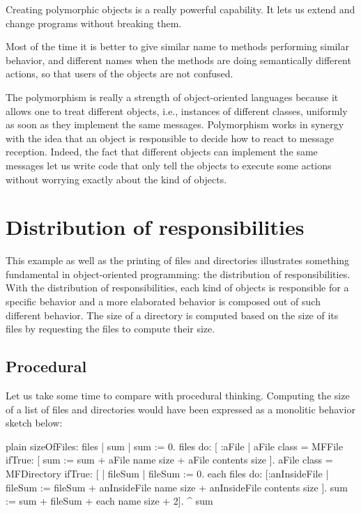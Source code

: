 \documentclass[10pt,twoside,english]{_support/latex/sbabook/sbabook}
\begin{document}
\begin{important}
Creating polymorphic objects is a really powerful capability. It lets us extend and change programs without breaking them. 
\end{important}

Most of the time it is better to give similar name to methods performing similar behavior, and different names when the methods are doing semantically different actions, so that users of the objects are not confused. 

The  polymorphism is really a strength of object-oriented languages because it allows one to treat different objects, i.e., instances of different classes, uniformly as soon as they implement the same messages. Polymorphism works in synergy with the idea that an object is responsible to decide how to react to message reception. Indeed, the fact that different objects can implement the same messages let us write code that only tell the objects to execute some actions without worrying exactly about the kind of objects. 
\section{Distribution of responsibilities}
This example as well as the printing of files and directories illustrates something fundamental in 
object-oriented programming: the distribution of responsibilities. With the distribution of responsibilities,  each kind of objects is responsible for a specific behavior and a more elaborated behavior is composed out of such different behavior. The size of a directory is computed based on the size of its files by requesting the files to compute their size. 
\subsection{Procedural}
Let us take some time to compare with procedural thinking. Computing the size of a list of files and directories would have been expressed as a monolitic behavior sketch below:

\begin{displaycode}{plain}
sizeOfFiles: files
	| sum | 
	sum := 0.
	files do: [ :aFile | 
		aFile class = MFFile
			ifTrue: [ sum := sum + aFile name size + aFile contents size ].
		aFile class = MFDirectory
			ifTrue: [ 
				| fileSum |
				fileSum := 0.
				each files do: [:anInsideFile | fileSum := fileSum + anInsideFile name size + anInsideFile contents size ].
				sum := sum + fileSum + each name size + 2].
	^ sum	
\end{displaycode}
\end{document}
